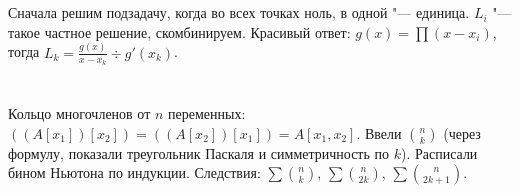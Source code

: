 \section{} %
Сначала решим подзадачу, когда во всех точках ноль, в одной "--- единица. $L_i$ "--- такое частное решение, скомбинируем.
Красивый ответ: $g(x) = \prod (x-x_i)$, тогда $L_k = \frac{g(x)}{x-x_k} \div g'(x_k)$.

\section{} %
Кольцо многочленов от $n$ переменных: $((A[x_1])[x_2])=((A[x_2])[x_1])=A[x_1,x_2]$. Ввели $\binom{n}{k}$ (через формулу, показали
треугольник Паскаля и симметричность по $k$). Расписали бином Ньютона по индукции. Следствия: $\sum \binom{n}{k}$, $\sum \binom{n}{2k}$,
$\sum \binom{n}{2k+1}$.
